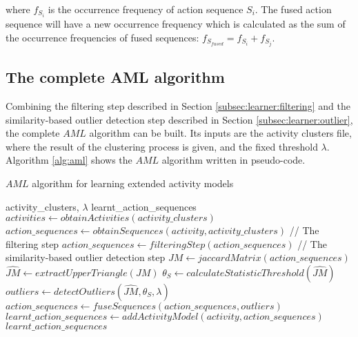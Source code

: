 \noindent where $f_{S_i}$ is the occurrence frequency of action sequence $S_i$. The fused action sequence will have a new occurrence frequency which is calculated as the sum of the occurrence frequencies of fused sequences: $f_{S_{fused}} = f_{S_i} + f_{S_j}$. 

\subsection{The complete AML algorithm}
\label{subsec:learner:complete}

Combining the filtering step described in Section \ref{subsec:learner:filtering} and the similarity-based outlier detection step described in Section \ref{subsec:learner:outlier}, the complete $AML$ algorithm can be built. Its inputs are the activity clusters file, where the result of the clustering process is given, and the fixed threshold $\lambda$. Algorithm \ref{alg:aml} shows the $AML$ algorithm written in pseudo-code.  

\begin{algorithm}
 \caption{$AML$ algorithm for learning extended activity models}
 \label{alg:aml}
 \begin{algorithmic}
 \REQUIRE activity\_clusters, $\lambda$
 \ENSURE learnt\_action\_sequences
 \STATE $activities \leftarrow obtainActivities(activity\_clusters)$
   \STATE $action\_sequences \leftarrow obtainSequences(activity, activity\_clusters)$
   \STATE // The filtering step
   \STATE $action\_sequences \leftarrow filteringStep(action\_sequences)$
   \STATE // The similarity-based outlier detection step
   \REPEAT
     \STATE $JM \leftarrow jaccardMatrix(action\_sequences)$
     \STATE $\hat{JM} \leftarrow extractUpperTriangle(JM)$
     \STATE $\theta_S \leftarrow calculateStatisticThreshold(\hat{JM})$
     \STATE $outliers \leftarrow detectOutliers(\hat{JM}, \theta_S, \lambda)$
     \STATE $action\_sequences \leftarrow fuseSequences(action\_sequences, outliers)$
   \STATE $learnt\_action\_sequences \leftarrow addActivityModel(activity, action\_sequences)$
 \ENDFOR
 \RETURN $learnt\_action\_sequences$ 
 \end{algorithmic}
\end{algorithm}


